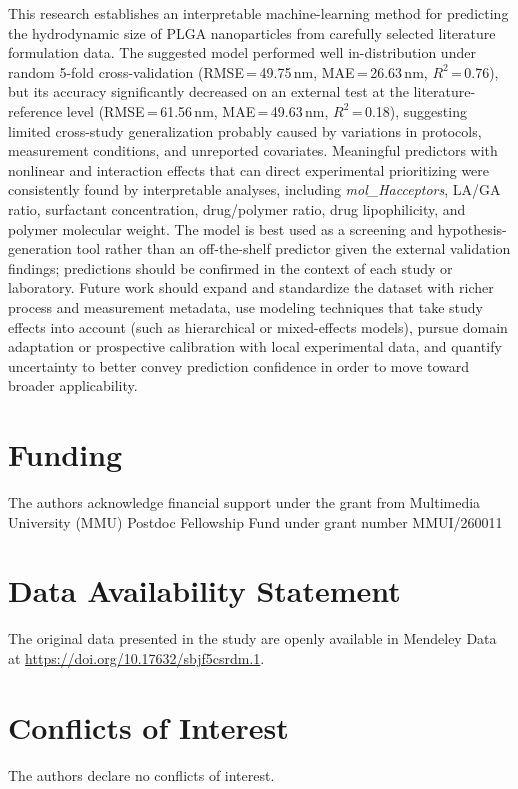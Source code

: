 \documentclass[10pt]{NSP1}
\begin{document}
This research establishes an interpretable machine-learning method for predicting the hydrodynamic
size of PLGA nanoparticles from carefully selected literature formulation data. The suggested model
performed well in-distribution under random 5-fold cross-validation
(RMSE\,=\,49.75\,nm, MAE\,=\,26.63\,nm, $R^2$\,=\,0.76), but its accuracy significantly decreased
on an external test at the literature-reference level
(RMSE\,=\,61.56\,nm, MAE\,=\,49.63\,nm, $R^2$\,=\,0.18), suggesting limited cross-study
generalization probably caused by variations in protocols, measurement conditions, and unreported
covariates. Meaningful predictors with nonlinear and interaction effects that can direct
experimental prioritizing were consistently found by interpretable analyses, including
\textit{mol\_Hacceptors}, LA/GA ratio, surfactant concentration, drug/polymer ratio, drug
lipophilicity, and polymer molecular weight. The model is best used as a screening and
hypothesis-generation tool rather than an off-the-shelf predictor given the external validation
findings; predictions should be confirmed in the context of each study or laboratory. Future work
should expand and standardize the dataset with richer process and measurement metadata, use
modeling techniques that take study effects into account (such as hierarchical or mixed-effects
models), pursue domain adaptation or prospective calibration with local experimental data, and
quantify uncertainty to better convey prediction confidence in order to move toward broader
applicability.



\section*{Funding}
The authors acknowledge financial support under the grant
from Multimedia University (MMU) Postdoc Fellowship
Fund under grant number MMUI/260011

\section*{Data Availability Statement}
The original data presented in the study are openly available in Mendeley Data at
\url{https://doi.org/10.17632/sbjf5csrdm.1}.

\section*{Conflicts of Interest}
The authors declare no conflicts of interest.
\end{document}
